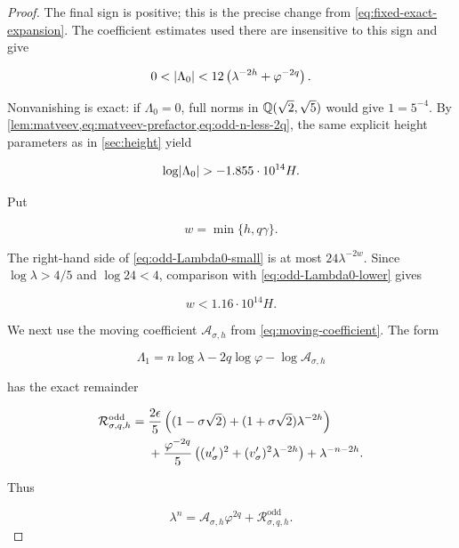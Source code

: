 \begin{proof}
The final sign is positive; this is the precise change from
\cref{eq:fixed-exact-expansion}. The coefficient estimates used there are
insensitive to this sign and give

\begin{equation}
 0<\lvert\Lambda_0\rvert
 <12\left(\lambda^{-2h}+\varphi^{-2q}\right).
 \label{eq:odd-Lambda0-small}
\end{equation}

Nonvanishing is exact: if $\Lambda_0=0$, full norms in
$\mathbb{Q}(\sqrt2,\sqrt5)$ would give $1=5^{-4}$. By
\cref{lem:matveev,eq:matveev-prefactor,eq:odd-n-less-2q}, the same explicit
height parameters as in \cref{sec:height} yield

\begin{equation}
 \log\lvert\Lambda_0\rvert>
 -1.855\mathbin{\cdot}10^{14}H.
 \label{eq:odd-Lambda0-lower}
\end{equation}

Put

\begin{equation}
 w=\min\{h,q\gamma\}.
\end{equation}

The right-hand side of \cref{eq:odd-Lambda0-small} is at most
$24\lambda^{-2w}$. Since $\log\lambda>4/5$ and $\log24<4$, comparison with
\cref{eq:odd-Lambda0-lower} gives

\begin{equation}
 w<1.16\mathbin{\cdot}10^{14}H.
 \label{eq:odd-w-logarithmic}
\end{equation}

We next use the moving coefficient $\mathcal A_{\sigma,h}$ from
\cref{eq:moving-coefficient}. The form

\begin{equation}
 \Lambda_1
 =n\log\lambda-2q\log\varphi
 -\log\mathcal A_{\sigma,h}
 \label{eq:odd-Lambda1}
\end{equation}

has the exact remainder

\begin{align}
 \mathcal R^{\mathrm{odd}}_{\sigma,q,h}={}&
 \frac{2\epsilon}{5}
 \left((1-\sigma\sqrt2)
 +(1+\sigma\sqrt2)\lambda^{-2h}\right)\notag\\
 &+\frac{\varphi^{-2q}}5
 \left((u'_\sigma)^2
 +(v'_\sigma)^2\lambda^{-2h}\right)
 +\lambda^{-n-2h}.
 \label{eq:odd-moving-remainder}
\end{align}

Thus

\begin{equation}
 \lambda^n
 =\mathcal A_{\sigma,h}\varphi^{2q}
 +\mathcal R^{\mathrm{odd}}_{\sigma,q,h}.
\end{equation}


\end{proof}
